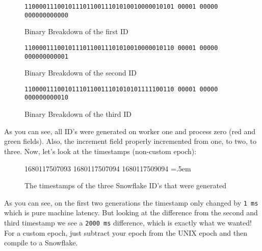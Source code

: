 \documentclass{article}
\newcommand{\code}[1]{\colorbox{cverbbg}{\texttt{#1}}}
\newcommand{\hn}[0]{\hfill \newline}
\newenvironment{lcverbatim}
 {\SaveVerbatim{cverb}}
 {\endSaveVerbatim
  \flushleft\fboxrule=0pt\fboxsep=.5em
  \colorbox{cverbbg}{%
    \makebox[\dimexpr\linewidth-2\fboxsep][l]{\BUseVerbatim{cverb}}%
  }
  \endflushleft
}
\begin{document}
\begin{figure}[H]
    \large{\texttt{\color{cyan}11000011100101110110011101010010000010101 \color{red}00001 \color{green}00000 \color{gray}000000000000}} \newline
    \caption{Binary Breakdown of the first ID}
    \label{fig:breakdown_1}
\end{figure}

\begin{figure}[H]
    \large{\texttt{\color{cyan}11000011100101110110011101010010000010110 \color{red}00001 \color{green}00000 \color{gray}000000000001}} \newline
    \caption{Binary Breakdown of the second ID}
    \label{fig:breakdown_2}
\end{figure}

\begin{figure}[H]
    \large{\texttt{\color{cyan}11000011100101110110011101010101111100110 \color{red}00001 \color{green}00000 \color{gray}000000000010}} \newline
    \caption{Binary Breakdown of the third ID}
    \label{fig:breakdown_3}
\end{figure}

\hn
As you can see, all ID's were generated on worker one and process zero (red and green fields). \newline
\hn
Also, the increment field properly incremented from one, to two, to three. \newline
\hn
Now, let's look at the timestamps (non-custom epoch):

\begin{figure}[H]
    \begin{lcverbatim}
    1680117507093
    1680117507094
    1680117509094
    \end{lcverbatim}
    \caption{The timestamps of the three Snowflake ID's that were generated}
    \label{fig:breakdown_timestamps}
\end{figure}
As you can see, on the first two generations the timestamp only changed by \code{1 ms} which is pure machine latency.
But looking at the difference from the second and third timestamp we see a \code{2000 ms} difference, which is exactly what we wanted! \newline
\hn
For a custom epoch, just subtract your epoch from the UNIX epoch and then compile to a Snowflake.

\break
\end{document}
